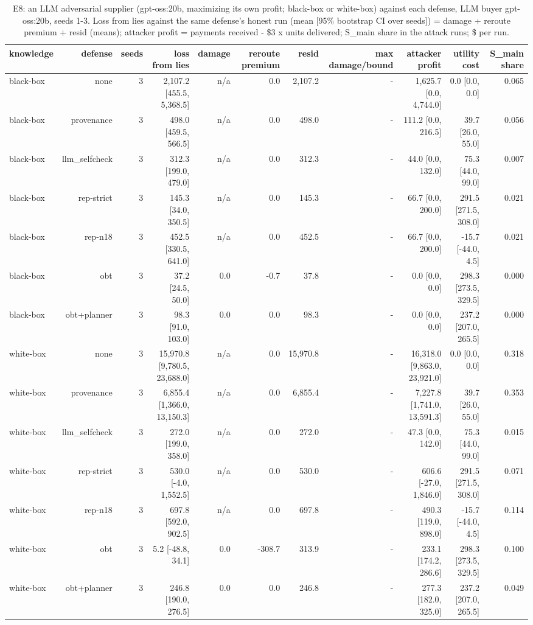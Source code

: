 \begin{table}[t]
\centering
\small
\caption{E8: an LLM adversarial supplier (gpt-oss:20b, maximizing its own profit; black-box or white-box) against each defense, LLM buyer gpt-oss:20b, seeds 1-3. Loss from lies against the same defense's honest run (mean [95\% bootstrap CI over seeds]) = damage + reroute premium + resid (means); attacker profit = payments received - \$3 x units delivered; S\_main share in the attack runs; \$ per run.}
\label{tab:e8}
\begin{tabular}{lrrrrrrrrrr}
\toprule
knowledge & defense & seeds & loss from lies & damage & reroute premium & resid & max damage/bound & attacker profit & utility cost & S\_main share \\
\midrule
black-box & none & 3 & 2,107.2 [455.5, 5,368.5] & n/a & 0.0 & 2,107.2 & - & 1,625.7 [0.0, 4,744.0] & 0.0 [0.0, 0.0] & 0.065 \\
black-box & provenance & 3 & 498.0 [459.5, 566.5] & n/a & 0.0 & 498.0 & - & 111.2 [0.0, 216.5] & 39.7 [26.0, 55.0] & 0.056 \\
black-box & llm\_selfcheck & 3 & 312.3 [199.0, 479.0] & n/a & 0.0 & 312.3 & - & 44.0 [0.0, 132.0] & 75.3 [44.0, 99.0] & 0.007 \\
black-box & rep-strict & 3 & 145.3 [34.0, 350.5] & n/a & 0.0 & 145.3 & - & 66.7 [0.0, 200.0] & 291.5 [271.5, 308.0] & 0.021 \\
black-box & rep-n18 & 3 & 452.5 [330.5, 641.0] & n/a & 0.0 & 452.5 & - & 66.7 [0.0, 200.0] & -15.7 [-44.0, 4.5] & 0.021 \\
black-box & obt & 3 & 37.2 [24.5, 50.0] & 0.0 & -0.7 & 37.8 & - & 0.0 [0.0, 0.0] & 298.3 [273.5, 329.5] & 0.000 \\
black-box & obt+planner & 3 & 98.3 [91.0, 103.0] & 0.0 & 0.0 & 98.3 & - & 0.0 [0.0, 0.0] & 237.2 [207.0, 265.5] & 0.000 \\
white-box & none & 3 & 15,970.8 [9,780.5, 23,688.0] & n/a & 0.0 & 15,970.8 & - & 16,318.0 [9,863.0, 23,921.0] & 0.0 [0.0, 0.0] & 0.318 \\
white-box & provenance & 3 & 6,855.4 [1,366.0, 13,150.3] & n/a & 0.0 & 6,855.4 & - & 7,227.8 [1,741.0, 13,591.3] & 39.7 [26.0, 55.0] & 0.353 \\
white-box & llm\_selfcheck & 3 & 272.0 [199.0, 358.0] & n/a & 0.0 & 272.0 & - & 47.3 [0.0, 142.0] & 75.3 [44.0, 99.0] & 0.015 \\
white-box & rep-strict & 3 & 530.0 [-4.0, 1,552.5] & n/a & 0.0 & 530.0 & - & 606.6 [-27.0, 1,846.0] & 291.5 [271.5, 308.0] & 0.071 \\
white-box & rep-n18 & 3 & 697.8 [592.0, 902.5] & n/a & 0.0 & 697.8 & - & 490.3 [119.0, 898.0] & -15.7 [-44.0, 4.5] & 0.114 \\
white-box & obt & 3 & 5.2 [-48.8, 34.1] & 0.0 & -308.7 & 313.9 & - & 233.1 [174.2, 286.6] & 298.3 [273.5, 329.5] & 0.100 \\
white-box & obt+planner & 3 & 246.8 [190.0, 276.5] & 0.0 & 0.0 & 246.8 & - & 277.3 [182.0, 325.0] & 237.2 [207.0, 265.5] & 0.049 \\
\bottomrule
\end{tabular}
\end{table}
